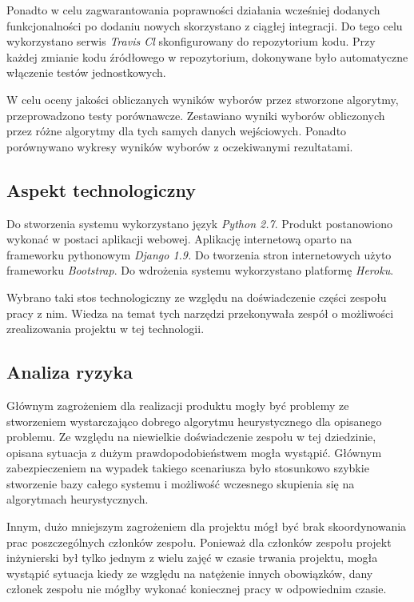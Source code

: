 \documentclass[polish,11pt]{aghthesis}
\begin{document}
Ponadto w celu zagwarantowania poprawności działania wcześniej dodanych
funkcjonalności po dodaniu nowych skorzystano z ciągłej integracji. Do tego celu
wykorzystano serwis \textit{Travis Cl} skonfigurowany do repozytorium kodu. Przy każdej zmianie kodu źródłowego w repozytorium, dokonywane było automatyczne włączenie testów
jednostkowych.  

W celu oceny jakości obliczanych wyników wyborów przez stworzone algorytmy,
przeprowadzono testy porównawcze. Zestawiano wyniki wyborów obliczonych przez różne
algorytmy dla tych samych danych wejściowych. Ponadto porównywano wykresy wyników
wyborów z oczekiwanymi rezultatami.
\clearpage

\subsection{Aspekt technologiczny}
Do stworzenia systemu wykorzystano język \textit{Python 2.7}. Produkt postanowiono wykonać w
postaci aplikacji webowej. Aplikację internetową oparto na frameworku pythonowym \textit{Django 1.9.} Do tworzenia stron internetowych użyto frameworku \textit{Bootstrap}. Do wdrożenia systemu wykorzystano platformę \textit{Heroku}.

Wybrano taki stos technologiczny ze względu na doświadczenie części zespołu pracy z nim.
Wiedza na temat tych narzędzi przekonywała zespół o możliwości zrealizowania projektu w
tej technologii.

\subsection{Analiza ryzyka}
Głównym zagrożeniem dla realizacji produktu mogły być problemy ze stworzeniem
wystarczająco dobrego algorytmu heurystycznego dla opisanego problemu. Ze względu na
niewielkie doświadczenie zespołu w tej dziedzinie, opisana sytuacja z dużym prawdopodobieństwem mogła wystąpić. Głównym
zabezpieczeniem na wypadek takiego scenariusza było stosunkowo szybkie stworzenie
bazy całego systemu i możliwość wczesnego skupienia się na algorytmach heurystycznych.

Innym, dużo mniejszym zagrożeniem dla projektu mógł być brak skoordynowania prac
poszczególnych członków zespołu. Ponieważ dla członków zespołu projekt inżynierski był
tylko jednym z wielu zajęć w czasie trwania projektu, mogła wystąpić sytuacja kiedy ze
względu na natężenie innych obowiązków, dany członek zespołu nie mógłby wykonać
koniecznej pracy w odpowiednim czasie.
\end{document}
